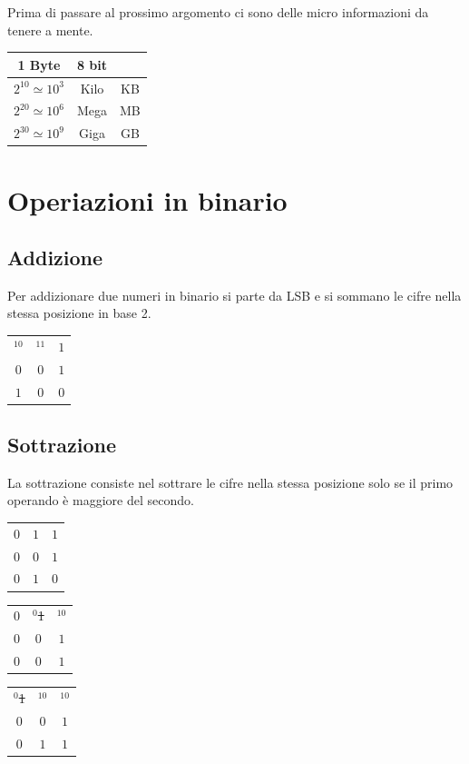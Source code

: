 Prima di passare al prossimo argomento ci sono delle micro informazioni da tenere a mente.
\begin{center}
    \begin{tabular}{ c | c c}
        1 Byte & 8 bit\\\hline
        $2^{10}\simeq10^3$ & Kilo & KB\\\hline
        $2^{20}\simeq10^6$ & Mega & MB\\\hline
        $2^{30}\simeq10^9$ & Giga & GB
    \end{tabular}
\end{center}

\section{Operiazioni in binario}
\subsection*{Addizione}
Per addizionare due numeri in binario si parte da LSB e si sommano le cifre nella stessa posizione in base 2.
\begin{center}
    \begin{tabular}{c c c}
        \centering
        $^10$ & $^11$ & $1$\\
        $0$ & $0$ & $1$\\\hline
        $1$ & $0$ & $0$
    \end{tabular}
\end{center}

\subsection*{Sottrazione}
La sottrazione consiste nel sottrare le cifre nella stessa posizione solo se il primo operando è maggiore del secondo.
\begin{center}
    \begin{tabular}{c c c}
        \centering
        $0$ & $1$ & $1$\\
        $0$ & $0$ & $1$\\\hline
        $0$ & $1$ & $0$
    \end{tabular}\hspace{0,5cm}
    \begin{tabular}{c c c}
        \centering
        $0$ & $^0$\sout{1} & $^10$\\
        $0$ & $0$ & $1$\\\hline
        $0$ & $0$ & $1$
    \end{tabular}\hspace{0,5cm}
    \begin{tabular}{c c c}
        \centering
        $^0$\sout{1} & $^10$ & $^10$\\
        $0$ & $0$ & $1$\\\hline
        $0$ & $1$ & $1$
    \end{tabular}
\end{center}

